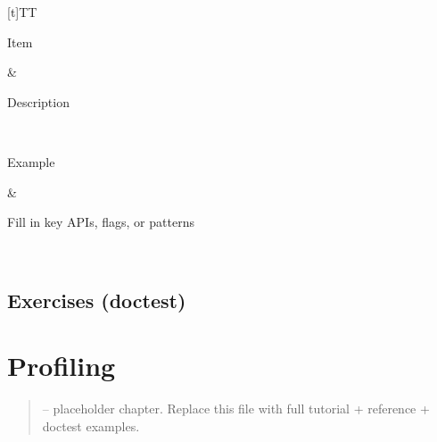 \documentclass[a4paper,11pt,english]{sphinxmanual}
\begin{document}
\begin{savenotes}\sphinxattablestart
\sphinxthistablewithglobalstyle
\centering
\begin{tabulary}{\linewidth}[t]{TT}
\sphinxtoprule
\begin{varwidth}[t]{}
\sphinxstyletheadfamily \sphinxAtStartPar
Item
\sphinxbeforeendvarwidth
\end{varwidth}%
&\begin{varwidth}[t]{}
\sphinxstyletheadfamily \sphinxAtStartPar
Description
\sphinxbeforeendvarwidth
\end{varwidth}%
\\
\sphinxmidrule
\sphinxtableatstartofbodyhook\begin{varwidth}[t]{}
\sphinxAtStartPar
Example
\sphinxbeforeendvarwidth
\end{varwidth}%
&\begin{varwidth}[t]{}
\sphinxAtStartPar
Fill in key APIs, flags, or patterns
\sphinxbeforeendvarwidth
\end{varwidth}%
\\
\sphinxbottomrule
\end{tabulary}
\sphinxtableafterendhook\par
\sphinxattableend\end{savenotes}


\subsection{Exercises (doctest)}
\label{\detokenize{performance/optimisation:exercises-doctest}}
\begin{sphinxVerbatim}[commandchars=\\\{\}]
\end{sphinxVerbatim}

\sphinxstepscope


\section{Profiling}
\label{\detokenize{performance/profiling:profiling}}\label{\detokenize{performance/profiling::doc}}\begin{quote}

\sphinxAtStartPar
{} – placeholder chapter. Replace this file with full tutorial + reference + doctest examples.
\end{quote}
\end{document}
